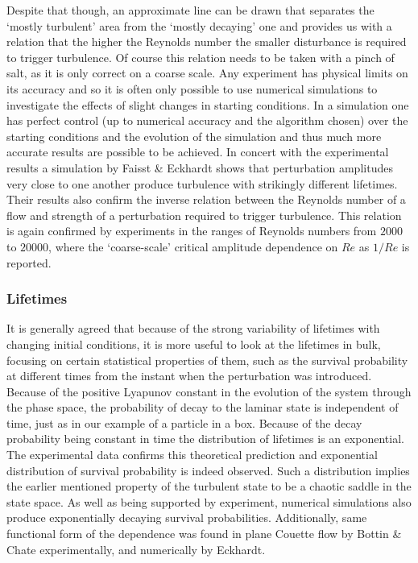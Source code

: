 \documentclass[11pt,a4paper]{article}
\begin{document}
Despite that though, an approximate line can be drawn that separates the `mostly turbulent' area from the `mostly decaying' one and provides us with a relation that the higher the Reynolds number the smaller disturbance is required to trigger turbulence.
Of course this relation needs to be taken with a pinch of salt, as it is only correct on a coarse scale\cite{Eckhardt07}.
Any experiment has physical limits on its accuracy and so it is often only possible to use numerical simulations to investigate the effects of slight changes in starting conditions.
In a simulation one has perfect control (up to numerical accuracy and the algorithm chosen) over the starting conditions and the evolution of the simulation and thus much more accurate results are possible to be achieved.
In concert with the experimental results a simulation by Faisst \& Eckhardt\cite{Faisst04} shows that perturbation amplitudes very close to one another produce turbulence with strikingly different lifetimes.
Their results also confirm the inverse relation between the Reynolds number of a flow and strength of a perturbation required to trigger turbulence.
This relation is again confirmed by experiments in the ranges of Reynolds numbers from \(2000\) to \(20000\), where the `coarse-scale' critical amplitude dependence on \(Re\) as \(1 / Re\) is reported\cite{Hof03}\cite{Hof04}\cite{Draad98}.

\subsubsection{Lifetimes}
It is generally agreed that because of the strong variability of lifetimes with changing initial conditions, it is more useful to look at the lifetimes in bulk, focusing on certain statistical properties of them, such as the survival probability at different times from the instant when the perturbation was introduced.
Because of the positive Lyapunov constant in the evolution of the system through the phase space, the probability of decay to the laminar state is independent of time, just as in our example of a particle in a box.
Because of the decay probability being constant in time the distribution of lifetimes is an exponential\cite{Kadanoff84}.
The experimental data confirms this theoretical prediction and exponential distribution of survival probability is indeed observed.
Such a distribution implies the earlier mentioned property of the turbulent state to be a chaotic saddle in the state space.
As well as being supported by experiment, numerical simulations also produce exponentially decaying survival probabilities\cite{Eckhardt02}.
Additionally, same functional form of the dependence was found in plane Couette flow by Bottin \& Chate\cite{Bottin98} experimentally, and numerically by Eckhardt\cite{Eckhardt02}.
\end{document}
